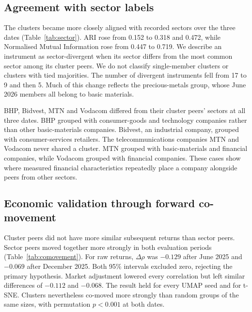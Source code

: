 \subsection{Agreement with sector labels}

The clusters became more closely aligned with recorded sectors over the three dates (Table~\ref{tab:sector}). ARI rose from 0.152 to 0.318 and 0.472, while Normalised Mutual Information rose from 0.447 to 0.719. We describe an instrument as sector-divergent when its sector differs from the most common sector among its cluster peers. We do not classify single-member clusters or clusters with tied majorities. The number of divergent instruments fell from 17 to 9 and then 5. Much of this change reflects the precious-metals group, whose June 2026 members all belong to basic materials.

\begin{table}[htbp]
\centering\caption{Agreement between the UMAP clusters and the recorded sector labels, and the sector-divergent instruments at each date.}\label{tab:sector}
\footnotesize

\end{table}

BHP, Bidvest, MTN and Vodacom differed from their cluster peers' sectors at all three dates. BHP grouped with consumer-goods and technology companies rather than other basic-materials companies. Bidvest, an industrial company, grouped with consumer-services retailers. The telecommunications companies MTN and Vodacom never shared a cluster. MTN grouped with basic-materials and financial companies, while Vodacom grouped with financial companies. These cases show where measured financial characteristics repeatedly place a company alongside peers from other sectors.

\subsection{Economic validation through forward co-movement}\label{sec:comovement}

Cluster peers did not have more similar subsequent returns than sector peers. Sector peers moved together more strongly in both evaluation periods (Table~\ref{tab:comovement}). For raw returns, $\Delta\rho$ was $-0.129$ after June 2025 and $-0.069$ after December 2025. Both 95\% intervals excluded zero, rejecting the primary hypothesis. Market adjustment lowered every correlation but left similar differences of $-0.112$ and $-0.068$. The result held for every UMAP seed and for t-SNE. Clusters nevertheless co-moved more strongly than random groups of the same sizes, with permutation $p<0.001$ at both dates.

